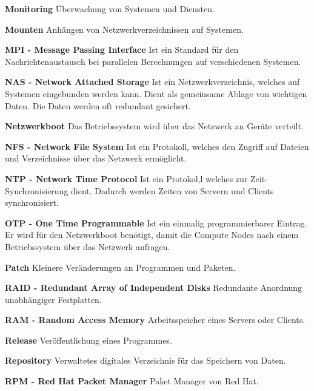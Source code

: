 \textbf{Monitoring}\newline
Überwachung von Systemen und Diensten.

\textbf{Mounten}\newline
Anhängen von Netzwerkverzeichnissen auf Systemen.

\textbf{MPI - Message Passing Interface}\newline
Ist ein Standard für den Nachrichtenaustausch bei parallelen Berechnungen auf verschiedenen Systemen. 

\textbf{NAS - Network Attached Storage}\newline
Ist ein Netzwerkverzeichnis, welches auf Systemen eingebunden werden kann. Dient als gemeinsame Ablage von wichtigen Daten. Die Daten werden oft redundant gesichert. 

\textbf{Netzwerkboot}\newline
Das Betriebssystem wird über das Netzwerk an Geräte verteilt.

\textbf{NFS - Network File System}\newline
Ist ein Protokoll, welches den Zugriff auf Dateien und Verzeichnisse über das Netzwerk ermöglicht.

\textbf{NTP - Network Time Protocol}\newline
Ist ein Protokol,l welches zur Zeit-Synchronisierung dient. Dadurch werden Zeiten von Servern und Clients synchronisiert.

\textbf{OTP - One Time Programmable}\newline
Ist ein einmalig programmierbarer Eintrag. Er wird für den Netzwerkboot benötigt, damit die Compute Nodes nach einem Betriebssystem über das Netzwerk anfragen.

\textbf{Patch}\newline
Kleinere Veränderungen an Programmen und Paketen.

\textbf{RAID - Redundant Array of Independent Disks}\newline
Redundante Anordnung unabhängiger Festplatten.

\textbf{RAM - Random Access Memory}\newline
Arbeitsspeicher eines Servers oder Clients.

\textbf{Release}\newline
Veröffentlichung eines Programmes.

\textbf{Repository}\newline
Verwaltetes digitales Verzeichnis für das Speichern von Daten.

\textbf{RPM - Red Hat Packet Manager} \newline
Paket Manager von Red Hat.

